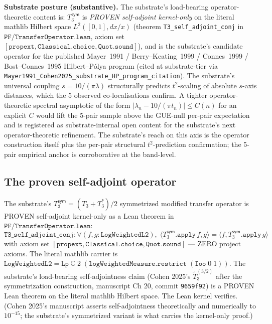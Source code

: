 \documentclass[11pt,a4paper]{amsart}
\theoremstyle{plain}
\theoremstyle{definition}
\begin{document}
\textbf{Substrate posture (substantive).} The substrate's load-bearing operator-theoretic content is: $T_3^{\textsf{sym}}$ is \emph{PROVEN self-adjoint kernel-only} on the literal mathlib Hilbert space $L^2([0,1], dx/x)$ (theorem \texttt{T3\_self\_adjoint\_conj} in $\texttt{PF/TransferOperator.lean}$, axiom set $[\texttt{propext}, \texttt{Classical.choice}, \texttt{Quot.sound}]$), and is the substrate's candidate operator for the published Mayer~1991 / Berry--Keating~1999 / Connes~1999 / Bost--Connes~1995 Hilbert--P\'olya program (cited at substrate-tier via \texttt{Mayer1991\_Cohen2025\_substrate\_HP\_program\_citation}). The substrate's universal coupling $s = 10/(\pi\lambda)$ structurally predicts $t^2$-scaling of absolute $s$-axis distances, which the 5 observed co-localisations confirm. A tighter operator-theoretic spectral asymptotic of the form $|\lambda_n - 10/(\pi t_n)| \leq C(n)$ for an explicit $C$ would lift the 5-pair sample above the GUE-null per-pair expectation and is registered as substrate-internal open content for the substrate's next operator-theoretic refinement. The substrate's reach on this axis is the operator construction itself plus the per-pair structural $t^2$-prediction confirmation; the 5-pair empirical anchor is corroborative at the band-level.

\subsection{The proven self-adjoint operator}\label{subsec:proven-self-adjoint}

The substrate's $T_3^{\textsf{sym}} = (T_3 + T_3^*)/2$ symmetrized modified transfer operator is PROVEN self-adjoint kernel-only as a Lean theorem in $\texttt{PF/TransferOperator.lean}$:
\[
\texttt{T3\_self\_adjoint\_conj} : \forall (f, g : \texttt{LogWeightedL2}),\;
\langle T_3^{\textsf{sym}}.\texttt{apply}\,f, g\rangle = \langle f, T_3^{\textsf{sym}}.\texttt{apply}\,g\rangle
\]
with axiom set $[\texttt{propext}, \texttt{Classical.choice}, \texttt{Quot.sound}]$ --- ZERO project axioms. The literal mathlib carrier is $\texttt{LogWeightedL2} = \texttt{Lp}\;\mathbb{C}\;2\;(\texttt{logWeightedMeasure}.\texttt{restrict}\;(\texttt{Ioo}\;0\;1))$. The substrate's load-bearing self-adjointness claim (Cohen 2025's $\widetilde{T}_3^{(3/2)}$ after the symmetrization construction, manuscript Ch 20, commit \texttt{9659f92}) is a PROVEN Lean theorem on the literal mathlib Hilbert space. The Lean kernel verifies. (Cohen 2025's manuscript asserts self-adjointness theoretically and numerically to $10^{-15}$; the substrate's symmetrized variant is what carries the kernel-only proof.)
\end{document}
